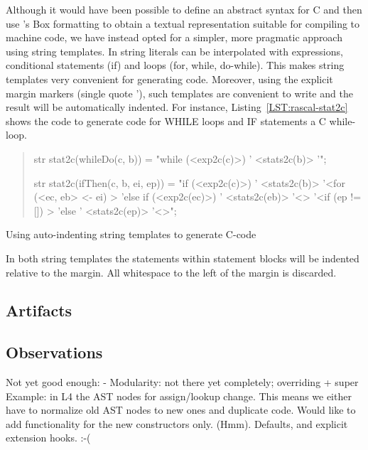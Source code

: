 Although it would have been possible to define an abstract
syntax for C and then use \Rascal's Box formatting to obtain a textual
representation suitable for compiling to machine code, we have instead
opted for a simpler, more pragmatic approach using string
templates. In \Rascal string literals can be interpolated with
expressions, conditional statements (if) and loops (for, while,
do-while). This makes string templates very convenient for generating
code. Moreover, using the explicit margin markers (single quote '),
such templates are convenient to write and the result will be
automatically indented. For instance, Listing~\ref{LST:rascal-stat2c} shows the code to generate
code for WHILE loops and IF statements a C while-loop.
\begin{listing}
\begin{quote}
\begin{rascal}
str stat2c(whileDo(c, b)) = "while (<exp2c(c)>) {
                            '  <stats2c(b)>
                            '}";

str stat2c(ifThen(c, b, ei, ep)) = 
                            "if (<exp2c(c)>) {
                            '  <stats2c(b)>
                            '}<for (<ec, eb> <- ei) {>
                            'else if (<exp2c(ec)>) {
                            '  <stats2c(eb)>
                            '}<}>
                            '<if (ep != []) {>
                            'else {
                            '  <stats2c(ep)>
                            '}<}>";
\end{rascal}
\end{quote}
\caption{Using auto-indenting string templates to generate C-code}
\label{LST:rascal-stat2c}
\end{listing}
In both string templates the statements within statement blocks will
be indented relative to the margin. All whitespace to the left of the
margin is discarded.


\subsection{Artifacts}

\subsection{Observations}

Not yet good enough:
- Modularity: not there yet completely; overriding + super
  Example: in L4 the AST nodes for assign/lookup change. This means we
  either have to normalize old AST nodes to new ones and duplicate
  code. Would like to add functionality for the new constructors
  only. (Hmm). Defaults, and explicit extension hooks. :-(

